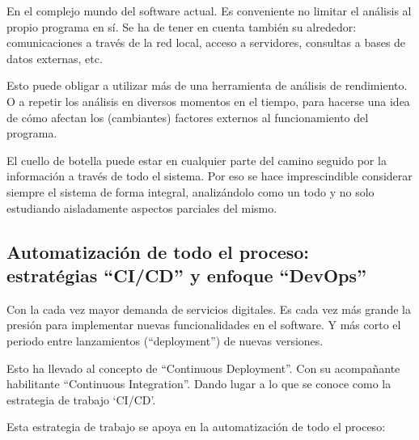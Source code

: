\documentclass[spanish,12pt,a4paper,final,oneside]{book}
\begin{document}
En el complejo mundo del software actual. Es conveniente no limitar el análisis al propio programa en sí. Se ha de tener en cuenta  también su alrededor: comunicaciones a través de la red local, acceso a servidores, consultas a bases de datos externas, etc.

Esto puede obligar a utilizar más de una herramienta de análisis de rendimiento. O a repetir los análisis en diversos momentos en el tiempo, para hacerse una idea de cómo afectan los (cambiantes) factores externos al funcionamiento del programa.

El cuello de botella puede estar en cualquier parte del camino seguido por la información a través de todo el sistema. Por eso se hace imprescindible considerar siempre el sistema de forma integral, analizándolo como un todo y no solo estudiando aisladamente aspectos parciales del mismo.


\subsection{Automatización de todo el proceso:\\estratégias ``CI/CD'' y enfoque ``DevOps''}

Con la cada vez mayor demanda de servicios digitales. Es cada vez más grande la presión para implementar nuevas funcionalidades en el software. Y más corto el periodo entre lanzamientos (``deployment'') de nuevas versiones.

Esto ha llevado al concepto de ``Continuous Deployment''. Con su acompañante habilitante ``Continuous Integration''. Dando lugar a lo que se conoce como la estrategia de trabajo `CI/CD'.

Esta estrategia de trabajo se apoya en la automatización de todo el proceso:
\end{document}
